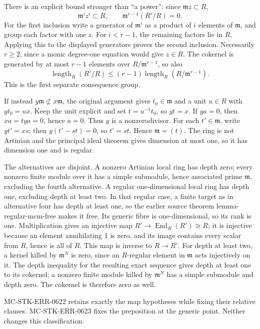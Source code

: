There is an explicit bound stronger than ``a power'': since \(\mathfrak m z\subset R\), \[
 \mathfrak m^i z^i\subset R,\qquad
 \mathfrak m^{r-1}(R'/R)=0.
\] For the first inclusion write a generator of \(\mathfrak m^i\) as a product of \(i\) elements of \(\mathfrak m\), and group each factor with one \(z\). For \(i<r-1\), the remaining factors lie in \(R\). Applying this to the displayed generators proves the second inclusion. Necessarily \(r\ge2\), since a monic degree-one equation would give \(z\in R\). The cokernel is generated by at most \(r-1\) elements over \(R/\mathfrak m^{r-1}\), so also \[
 \operatorname{length}_R(R'/R)
 \le (r-1)\operatorname{length}_R(R/\mathfrak m^{r-1}).
\] This is the first separate consequence group.

If instead \(y\mathfrak m\not\subset x\mathfrak m\), the original argument gives \(t_0\in\mathfrak m\) and a unit \(u\in R\) with \(yt_0=ux\). Keep the unit explicit and set \(t=u^{-1}t_0\), so \(yt=x\). If \(ya=0\), then \(xa=tya=0\), hence \(a=0\). Thus \(y\) is a nonzerodivisor. For each \(t'\in\mathfrak m\), write \(yt'=xs\); then \(y(t'-st)=0\), so \(t'=st\). Hence \(\mathfrak m=(t)\). The ring is not Artinian and the principal ideal theorem gives dimension at most one, so it has dimension one and is regular.

The alternatives are disjoint. A nonzero Artinian local ring has depth zero; every nonzero finite module over it has a simple submodule, hence associated prime \(\mathfrak m\), excluding the fourth alternative. A regular one-dimensional local ring has depth one, excluding depth at least two. In that regular case, a finite target as in alternative four has depth at least one, so the earlier source theorem lemma-\AlgebraIdentifierBreak{}regular-\AlgebraIdentifierBreak{}mcm-\AlgebraIdentifierBreak{}free makes it free. Its generic fibre is one-dimensional, so its rank is one. Multiplication gives an injective map \(R'\to\operatorname{End}_R(R')\cong R\); it is injective because an element annihilating \(1\) is zero, and its image contains every scalar from \(R\), hence is all of \(R\). This map is inverse to \(R\to R'\). For depth at least two, a kernel killed by \(\mathfrak m^N\) is zero, since an \(R\)-regular element in \(\mathfrak m\) acts injectively on it. The depth inequality for the resulting exact sequence gives depth at least one to its cokernel; a nonzero finite module killed by \(\mathfrak m^N\) has a simple submodule and depth zero. The cokernel is therefore zero as well.

MC-\AlgebraIdentifierBreak{}STK-\AlgebraIdentifierBreak{}ERR-\AlgebraIdentifierBreak{}0622 retains exactly the map hypotheses while fixing their relative clauses. MC-\AlgebraIdentifierBreak{}STK-\AlgebraIdentifierBreak{}ERR-\AlgebraIdentifierBreak{}0623 fixes the preposition at the generic point. Neither changes this classification.

